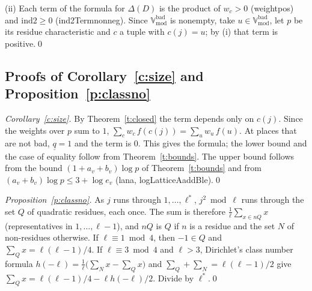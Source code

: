 \documentclass[11pt,a4paper]{article}
\newcommand{\Vbad}{\mathbb{V}_{\mathrm{mod}}^{\mathrm{bad}}}
\newcommand{\qb}{\underline{q}}
\newcommand{\itwo}{\mathrm{ind2}}
\newcommand{\leanus}{\textunderscore\allowbreak}
\newcommand{\lean}[1]{{\ttfamily\let\_\leanus #1}}
\theoremstyle{plain}
\theoremstyle{definition}
\theoremstyle{remark}
\begin{document}
(ii) Each term of the formula for $\Delta(D)$ is the product of $w_c>0$ (\lean{weight\_pos}) and $\itwo\ge0$
(\lean{ind2Term\_nonneg}). Since $\Vbad$ is nonempty, take $u\in\Vbad$, let $p$ be its residue characteristic and $c$
a tuple with $c(j)=u$; by (i) that term is positive.\qed

\subsection{Proofs of Corollary~\ref{c:size} and Proposition~\ref{p:classno}}
\emph{Corollary~\ref{c:size}.} By Theorem~\ref{t:closed} the term depends only on $c(j)$. Since the weights over $p$
sum to $1$, $\sum_cw_c\,f(c(j))=\sum_uw_u\,f(u)$. At places that are not bad, $\qb=1$ and the term is $0$. This gives
the formula; the lower bound and the case of equality follow from Theorem~\ref{t:bounds}. The upper bound follows from
the bound $(1+a_v+b_v)\log p$ of Theorem~\ref{t:bounds} and from $(a_v+b_v)\log p\le3+\log e_v$ (lana,
\lean{logLatticeA\_add\_B\_le}).\qed

\emph{Proposition~\ref{p:classno}.} As $j$ runs through $1,\dots,\ell^*$, $j^2\bmod\ell$ runs through the set $Q$ of
quadratic residues, each once. The sum is therefore $\frac1\ell\sum_{x\in nQ}x$ (representatives in
$1,\dots,\ell-1$), and $nQ$ is $Q$ if $n$ is a residue and the set $N$ of non-residues otherwise. If
$\ell\equiv1\bmod4$, then $-1\in Q$ and $\sum_Qx=\ell(\ell-1)/4$. If $\ell\equiv3\bmod4$ and $\ell>3$, Dirichlet's
class number formula $h(-\ell)=\frac1\ell\bigl(\sum_Nx-\sum_Qx\bigr)$ and $\sum_Q+\sum_N=\ell(\ell-1)/2$ give
$\sum_Qx=\ell(\ell-1)/4-\ell h(-\ell)/2$. Divide by $\ell^*$.\qed
\end{document}
